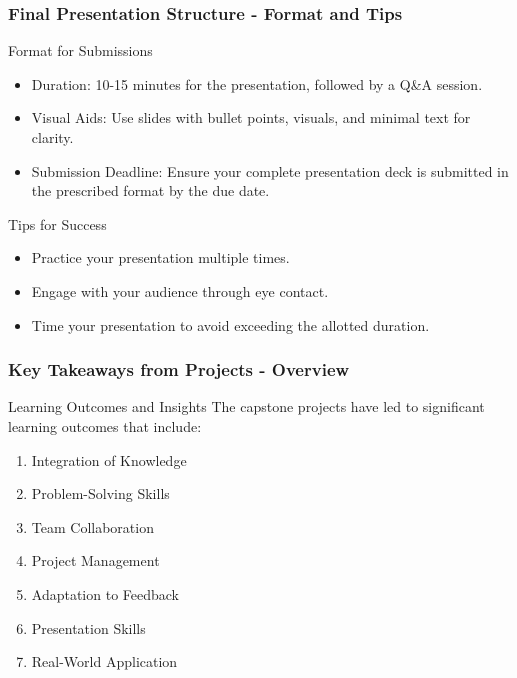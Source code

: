 \documentclass[aspectratio=169]{beamer}
\begin{document}
\begin{frame}[fragile]
    \frametitle{Final Presentation Structure - Format and Tips}
    \begin{block}{Format for Submissions}
        \begin{itemize}
            \item Duration: 10-15 minutes for the presentation, followed by a Q\&A session.
            \item Visual Aids: Use slides with bullet points, visuals, and minimal text for clarity.
            \item Submission Deadline: Ensure your complete presentation deck is submitted in the prescribed format by the due date.
        \end{itemize}
    \end{block}

    \begin{block}{Tips for Success}
        \begin{itemize}
            \item Practice your presentation multiple times.
            \item Engage with your audience through eye contact.
            \item Time your presentation to avoid exceeding the allotted duration.
        \end{itemize}
    \end{block}
\end{frame}

\begin{frame}[fragile]
  \frametitle{Key Takeaways from Projects - Overview}
  \begin{block}{Learning Outcomes and Insights}
    The capstone projects have led to significant learning outcomes that include:
  \end{block}
  
  \begin{enumerate}
    \item Integration of Knowledge
    \item Problem-Solving Skills
    \item Team Collaboration
    \item Project Management
    \item Adaptation to Feedback
    \item Presentation Skills
    \item Real-World Application
  \end{enumerate}
\end{frame}
\end{document}
